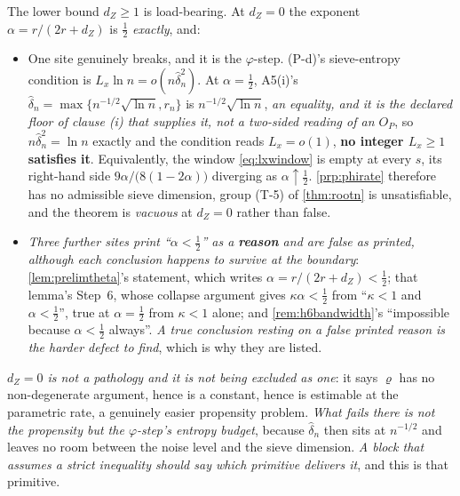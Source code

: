 \medskip
\noindent
 The lower bound $d_Z\ge1$ is load-bearing. At $d_Z=0$ the exponent $\alpha=r/(2r+d_Z)$ is
$\tfrac12$ \emph{exactly}, and:
\begin{itemize}
\item One site genuinely breaks, and it is the $\varphi$-step. (P-d)'s sieve-entropy condition is
$L_x\ln n=o(n\hat\delta_n^{2})$. At $\alpha=\tfrac12$, A5(i)'s $\hat\delta_n=\max\{n^{-1/2}\sqrt{\ln n},r_n\}$
is $n^{-1/2}\sqrt{\ln n}$, \emph{an equality, and it is the declared floor of clause \textup{(i)} that
supplies it, not a two-sided reading of an $O_P$}, so $n\hat\delta_n^{2}=\ln n$ exactly and the
condition reads $L_x=o(1)$, 
\textbf{no integer $L_x\ge1$ satisfies it}. Equivalently, the window \eqref{eq:lxwindow} is empty at every
$s$, its right-hand side $9\alpha/\big(8(1-2\alpha)\big)$ diverging as $\alpha\uparrow\tfrac12$.
\cref{prp:phirate} therefore has no admissible sieve dimension, group (T-5) of \cref{thm:rootn} is
unsatisfiable, and the theorem is \emph{vacuous} at $d_Z=0$ rather than false.
\item \emph{Three further sites print ``$\alpha<\tfrac12$'' as a \textbf{reason} and are false as printed,
although each conclusion happens to survive at the boundary}: \cref{lem:prelimtheta}'s statement, which
writes $\alpha=r/(2r+d_Z)<\tfrac12$; that lemma's Step~6, whose collapse argument gives
$\kappa\alpha<\tfrac12$ from ``$\kappa<1$ and $\alpha<\tfrac12$'', true at $\alpha=\tfrac12$ from
$\kappa<1$ alone; and \cref{rem:h6bandwidth}'s ``impossible because $\alpha<\tfrac12$ always''. \emph{A
true conclusion resting on a false printed reason is the harder defect to find}, which is why they are
listed.
\end{itemize}
\emph{$d_Z=0$ is not a pathology and it is not being excluded as one}: it
says $\varrho$ has no non-degenerate argument, hence is a constant, hence is estimable at the parametric
rate, a genuinely easier propensity problem. \emph{What fails there is not the propensity but the
$\varphi$-step's entropy budget}, because $\hat\delta_n$ then sits at $n^{-1/2}$ and leaves no room between
the noise level and the sieve dimension. \emph{A block that assumes a strict inequality should say which
primitive delivers it}, and this is that primitive.

